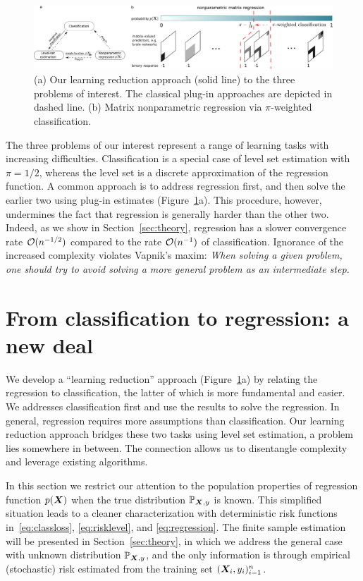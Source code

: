\documentclass[11pt]{article}
\theoremstyle{plain}
\theoremstyle{definition}
\begin{document}
\begin{figure}\centering
\includegraphics[width=1\textwidth]{new_demo.pdf}
\caption{(a) Our learning reduction approach (solid line) to the three problems of interest. The classical plug-in approaches are depicted in dashed line. (b) Matrix nonparametric regression via $\pi$-weighted classification.}\label{fig:diagram}
\end{figure}

The three problems of our interest represent a range of learning tasks with increasing difficulties. Classification is a special case of level set estimation with $\pi=1/2$, whereas the level set is a discrete approximation of the regression function. A common approach is to address regression first, and then solve the earlier two using plug-in estimates (Figure~\ref{fig:diagram}a). This procedure, however, undermines the fact that regression is generally harder than the other two. Indeed, as we show in Section~\ref{sec:theory}, regression has a slower convergence rate $\mathcal{O}(n^{-1/2})$ compared to the rate $\mathcal{O}(n^{-1})$ of classification. Ignorance of the increased complexity violates Vapnik’s maxim: \emph{When solving a given problem, one should try to avoid solving a more general problem as an intermediate step.} 

\section{From classification to regression: a new deal}\label{sec:idea}
We develop a ``learning reduction'' approach (Figure~\ref{fig:diagram}a) by relating the regression to classification, the latter of which is more fundamental and easier. We addresses classification first and use the results to solve the regression. In general, regression requires more assumptions than classification. Our learning reduction approach bridges these two tasks using level set estimation, a problem lies somewhere in between. The connection allows us to disentangle complexity and leverage existing algorithms. 

In this section we restrict our attention to the population properties of regression function $p(\bm X)$ when the true distribution $\mathbb{P}_{\bm X,y}$ is known. This simplified situation leads to a cleaner characterization with deterministic risk functions in~\eqref{eq:classloss}, \eqref{eq:risklevel}, and \eqref{eq:regression}. The finite sample estimation will be presented in Section~\ref{sec:theory}, in which we address the general case with unknown distribution $\mathbb{P}_{\bm X,y}$, and the only information is through empirical (stochastic) risk estimated from the training set $(\bm X_i,y_i)_{i=1}^n$. 
\end{document}
